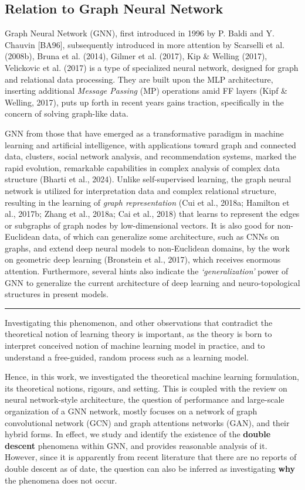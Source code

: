 \subsection{Relation to Graph Neural Network}
Graph Neural Network (GNN), first introduced in 1996 by P. Baldi and Y. Chauvin [BA96], subsequently introduced in more attention by Scarselli et al. (2008b), Bruna et al. (2014), Gilmer et al. (2017), Kip \& Welling (2017),  Velickovic et al. (2017) is a type of specialized neural network, designed for graph and relational data processing. They are built upon the MLP architecture, inserting additional \textit{Message Passing} (MP) operations amid FF layers (Kipf \& Welling, 2017), puts up forth in recent years gains traction, specifically in the concern of solving graph-like data. 

GNN from those that have emerged as a transformative paradigm in machine learning and artificial intelligence, with applications toward graph and connected data, clusters, social network analysis, and recommendation systems, marked the rapid evolution, remarkable capabilities in complex analysis of complex data structure (Bharti et al., 2024). Unlike self-supervised learning, the graph neural network is utilized for interpretation data and complex relational structure, resulting in the learning of \textit{ graph representation} (Cui et al., 2018a; Hamilton et al., 2017b; Zhang et al., 2018a; Cai et al., 2018) that learns to represent the edges or subgraphs of graph nodes by low-dimensional vectors. It is also good for non-Euclidean data, of which can generalize some architecture, such as CNNs on graphs, and extend deep neural models to non-Euclidean domains, by the work on geometric deep learning (Bronstein et al., 2017), which receives enormous attention. Furthermore, several hints also indicate the \textit{`generalization'} power of GNN to generalize the current architecture of deep learning and neuro-topological structures in present models. 

\begin{center}
    \rule{0.5\textwidth}{.4pt}
\end{center}
Investigating this phenomenon, and other observations that contradict the theoretical notion of learning theory is important, as the theory is born to interpret conceived notion of machine learning model in practice, and to understand a free-guided, random process such as a learning model. 

Hence, in this work, we investigated the theoretical machine learning formulation, its theoretical notions, rigours, and setting. This is coupled with the review on neural network-style architecture, the question of performance and large-scale organization of a GNN network, mostly focuses on a network of graph convolutional network (GCN) and graph attentions networks (GAN), and their hybrid forms. In effect, we study and identify the existence of the \textbf{double descent} phenomena within GNN, and provides reasonable analysis of it. However, since it is apparently from recent literature that there are no reports of double descent as of date, the question can also be inferred as investigating \textbf{why} the phenomena does not occur. 

